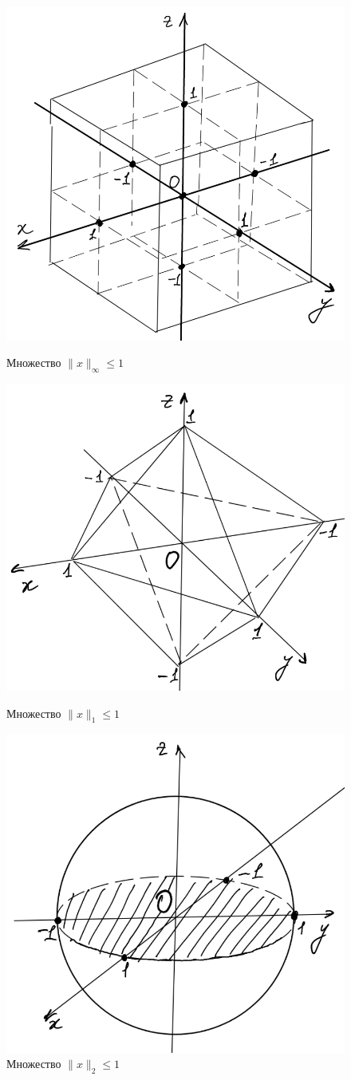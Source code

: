\documentclass[12pt, a4paper]{article}
\newcommand{\norm}[1]{\lVert #1 \rVert}
\begin{document}
\begin{enumerate}
	\begin{figure}[H]
		\begin{minipage}[b]{0.45\linewidth}
			\centering
			\includegraphics[width=0.7\linewidth]{pic1.png}
			\caption{Множество $\norm{x}_{\infty} \leq 1$}
			\label{rrr}
		\end{minipage}
		\hfill
		\begin{minipage}[b]{0.45\linewidth}
			\centering
			\includegraphics[width=0.7\linewidth]{pic2.png}
			\caption{Множество $\norm{x}_{1} \leq 1$}
			\label{ttt}
		\end{minipage}
		
		\vspace{1em}
		\begin{minipage}{\linewidth}
			\centering
			\includegraphics[width=0.3\linewidth]{pic3.png}
			\caption{Множество $\norm{x}_{2} \leq 1$}
		\end{minipage}
	\end{figure}
	

\end{enumerate}
\end{document}
